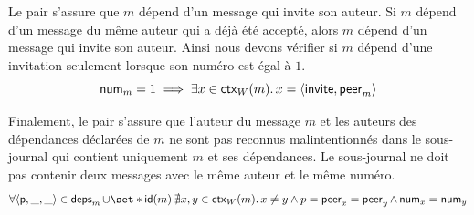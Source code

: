 Le pair s'assure que $m$ dépend d'un message qui invite son auteur.
Si $m$ dépend d'un message du même auteur qui a déjà été accepté, alors $m$ dépend d'un message qui invite son auteur.
Ainsi nous devons vérifier si $m$ dépend d'une invitation seulement lorsque son numéro est égal à $1$.
%
\begin{equation}\label{eq:invit-verif}
    \operatorname{\mathsf{num}}_m = 1 \implies \exists x \in \operatorname{\mathsf{ctx}}_W(m) \ldotp x = \langle\operatorname{\mathsf{invite}}, \operatorname{\mathsf{peer}}_m\rangle
\end{equation}

%

Finalement, le pair s'assure que l'auteur du message $m$ et les auteurs des dépendances déclarées de $m$ ne sont pas reconnus malintentionnés dans le sous-journal qui contient uniquement $m$ et ses dépendances.
Le sous-journal ne doit pas contenir deux messages avec le même auteur et le même numéro.
%
%
\begin{equation}\label{eq:honest-verif}
    \forall \tuple*{\trm{p}, \_, \_} \in \trm{deps}_m \cup \set*{\trm{id}(m)} \:\nexists x, y \in \trm{ctx}_W(m) \qsep x \neq y \land p = \trm{peer}_x = \trm{peer}_y \land \trm{num}_x = \trm{num}_y
\end{equation}

